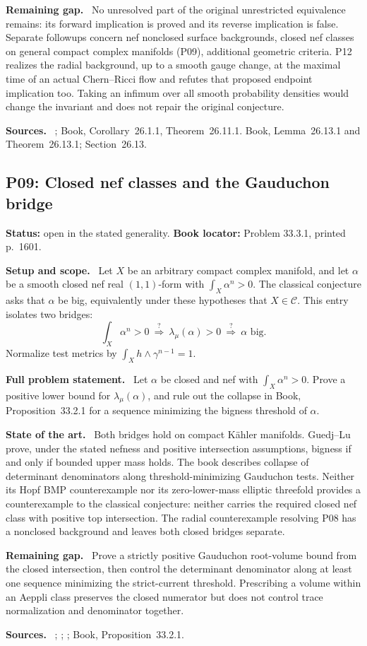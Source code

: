\documentclass[11pt]{article}
\newcommand{\field}[1]{\par\medskip\noindent\textbf{#1.}\ }
\begin{document}
\field{Remaining gap} No unresolved part of the original unrestricted equivalence remains: its forward implication is proved and its reverse implication is false. Separate followups concern nef nonclosed surface backgrounds, closed nef classes on general compact complex manifolds (P09), additional geometric criteria. P12 realizes the radial background, up to a smooth gauge change, at the maximal time of an actual Chern--Ricci flow and refutes that proposed endpoint implication too. Taking an infimum over all smooth probability densities would change the invariant and does not repair the original conjecture.
\field{Sources} \cite{DP04,BEGZ10,GL22,BGL25}; Book, Corollary~26.1.1, Theorem~26.11.1. Book, Lemma~26.13.1 and Theorem~26.13.1; Section~26.13.
\subsection{P09: Closed nef classes and the Gauduchon bridge}
\label{P09}
\noindent\textbf{Status:} open in the stated generality. \textbf{Book locator:} Problem 33.3.1, printed p.~1601.
\field{Setup and scope} Let $X$ be an arbitrary compact complex manifold, and let $\alpha$ be a smooth closed nef real $(1,1)$-form with $\int_X\alpha^n>0$. The classical conjecture asks that $\alpha$ be big, equivalently under these hypotheses that $X\in\mathcal C$. This entry isolates two bridges:
\[\int_X\alpha^n>0\ \stackrel{?}{\Longrightarrow}\ \lambda_\mu(\alpha)>0
 \ \stackrel{?}{\Longrightarrow}\ \alpha\text{ big}.\]
Normalize test metrics by $\int_Xh\wedge\gamma^{n-1}=1$.
\field{Full problem statement} Let $\alpha$ be closed and nef with $\int_X\alpha^n>0$. Prove a positive lower bound for $\lambda_\mu(\alpha)$, and rule out the collapse in Book, Proposition~33.2.1 for a sequence minimizing the bigness threshold of $\alpha$.
\field{State of the art} Both bridges hold on compact K\"ahler manifolds. Guedj--Lu prove, under the stated nefness and positive intersection assumptions, bigness if and only if bounded upper mass holds. The book describes collapse of determinant denominators along threshold-minimizing Gauduchon tests. Neither its Hopf BMP counterexample nor its zero-lower-mass elliptic threefold provides a counterexample to the classical conjecture: neither carries the required closed nef class with positive top intersection. The radial counterexample resolving P08 has a nonclosed background and leaves both closed bridges separate.
\field{Remaining gap} Prove a strictly positive Gauduchon root-volume bound from the closed intersection, then control the determinant denominator along at least one sequence minimizing the strict-current threshold. Prescribing a volume within an Aeppli class preserves the closed numerator but does not control trace normalization and denominator together.
\field{Sources} \cite[Conjecture 0.8 and Theorem 0.7, published numbering]{DP04}; \cite[Theorem 4.9]{GL22}; \cite[Theorem C]{BGL25}; Book, Proposition~33.2.1.
\end{document}
